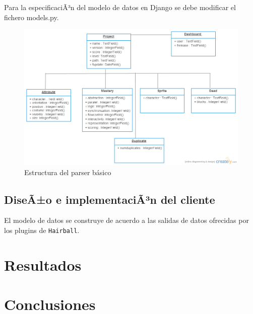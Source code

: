 \documentclass[a4paper, 12pt]{book}
\begin{document}
Para la especificaciÃ³n del modelo de datos en Django se debe modificar el fichero models.py. 


\begin{figure}
  \centering
  \includegraphics{img/modelo}
  \caption{Estructura del parser básico}
\end{figure}


\section{DiseÃ±o e implementaciÃ³n del cliente}
\label{sec:cliente}

El modelo de datos se construye de acuerdo a las salidas de datos ofrecidas por los plugins de
\texttt{Hairball}.





\cleardoublepage
\chapter{Resultados}



\cleardoublepage
\chapter{Conclusiones}
\label{chap:conclusiones}
\end{document}
